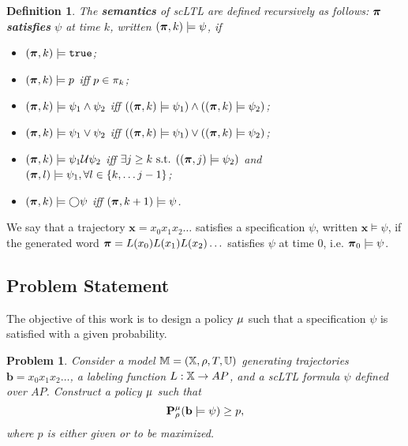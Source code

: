 \documentclass[conference]{IEEEtran}
\newtheorem{problem}{Problem}
\newtheorem{definition}{Definition}
\begin{document}
\begin{definition}
 The \textbf{semantics} of scLTL are defined recursively as follows: $\boldsymbol{\pi}$ \textbf{satisfies} $\psi$ at time $k$, written $(\boldsymbol{\pi}, k) \models \psi$, if
 \begin{itemize}
    \item $(\boldsymbol{\pi}, k) \models \texttt{true}$;
    \item $(\boldsymbol{\pi}, k) \models p$ iff $p \in \pi_k$;
    \item $(\boldsymbol{\pi}, k) \models \psi_1 \land  \psi_2  $ iff $ ( (\boldsymbol{\pi}, k) \models \psi_1 ) \land ( (\boldsymbol{\pi}, k) \models \psi_2 ) $;
    \item $(\boldsymbol{\pi}, k) \models \psi_1 \lor  \psi_2  $ iff $ ( (\boldsymbol{\pi}, k) \models \psi_1 ) \lor ( (\boldsymbol{\pi}, k) \models \psi_2 ) $;
    \item $(\boldsymbol{\pi}, k) \models  \psi_1 \mathcal{U} \psi_2 $ iff $\exists j \geq k \text{ s.t. } ((\boldsymbol{\pi}, j) \models \psi_2 ) $ and $(\boldsymbol{\pi}, l) \models \psi_1, \forall l \in \{k, \ldots j-1\}$;
    \item $(\boldsymbol{\pi}, k) \models \bigcirc \psi$ iff $(\boldsymbol{\pi}, k+1) \models \psi$.
 \end{itemize}

\end{definition}

We say that a trajectory $\mathbf{x} = x_0 x_1 x_2 \ldots$ satisfies a specification $\psi$, written $\mathbf{x} \models \psi$, if the generated word $\boldsymbol{\pi} =L(x_0) L(x_1) L(x_2) \ldots$ satisfies $\psi$ at time 0, i.e. $\boldsymbol{\pi}_0 \models \psi$.

\subsection{Problem Statement}

The objective of this work is to design a policy $\mu$ such that a specification $\psi$ is satisfied with a given probability.
\begin{problem}
\label{prob:main}
  Consider a model $\mathbb{M} = (\mathbb{X}, \rho, T, \mathbb{U})$ generating trajectories $\mathbf{b} = x_0 x_1 x_2 \ldots$, a labeling function $L : \mathbb{X} \rightarrow AP$, and a scLTL formula $\psi$ defined over $AP$. Construct a policy $\mu$ such that
  \begin{equation}\label{eq:probstatement}
    \Prob_\init^\pol ( \mathbf{b} \models \psi )\geq p,
  \end{equation}
  where $p$ is either given or to be maximized.
\end{problem}
\end{document}
